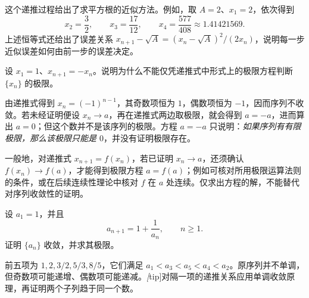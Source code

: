 \documentclass[UTF8,12pt,a4paper,fontset=fandol]{ctexbook}
\begin{document}
这个递推过程给出了求平方根的近似方法。例如，取 $A=2$、$x_1=2$，依次得到
\[
    x_2=\frac32,\qquad x_3=\frac{17}{12},\qquad
    x_4=\frac{577}{408}\approx1.41421569.
\]
上述恒等式还给出了误差关系 $x_{n+1}-\sqrt A=(x_n-\sqrt A)^2/(2x_n)$，说明每一步近似误差如何由前一步的误差决定。

\begin{example}
\label{ex:recurrence-fixed-point-without-convergence}
设 $x_1=1$、$x_{n+1}=-x_n$。说明为什么不能仅凭递推式中形式上的极限方程判断 $\{x_n\}$ 的极限。
\end{example}

\begin{solve}
由递推式得到 $x_n=(-1)^{n-1}$，其奇数项恒为 $1$，偶数项恒为 $-1$，因而序列不收敛。若未经证明便设 $x_n\to a$，再在递推式两边取极限，就会得到 $a=-a$，进而算出 $a=0$；但这个数并不是该序列的极限。方程 $a=-a$ 只说明：\emph{如果序列有有限极限，那么该极限只能是 $0$}，并没有证明极限存在。
\end{solve}

一般地，对递推式 $x_{n+1}=f(x_n)$，若已证明 $x_n\to a$，还须确认 $f(x_n)\to f(a)$，才能得到极限方程 $a=f(a)$；例如可核对所用极限运算法则的条件，或在后续连续性理论中核对 $f$ 在 $a$ 处连续。仅求出方程的解，不能替代对序列收敛性的证明。

\begin{example}
\label{ex:monotone-odd-even-golden-ratio}
设 $a_1=1$，并且
\begin{equation}
    a_{n+1}=1+\frac1{a_n},\qquad n\geq1.
    \label{eq:golden-ratio-recurrence}
\end{equation}
证明 $\{a_n\}$ 收敛，并求其极限。
\end{example}

\begin{analyze}
前五项为 $1,2,3/2,5/3,8/5$，它们满足 $a_1<a_3<a_5<a_4<a_2$。原序列并不单调，但奇数项可能递增、偶数项可能递减。\emph[tip]{对隔一项的递推关系应用单调收敛原理，再证明两个子列趋于同一个数。}
\end{analyze}
\end{document}
